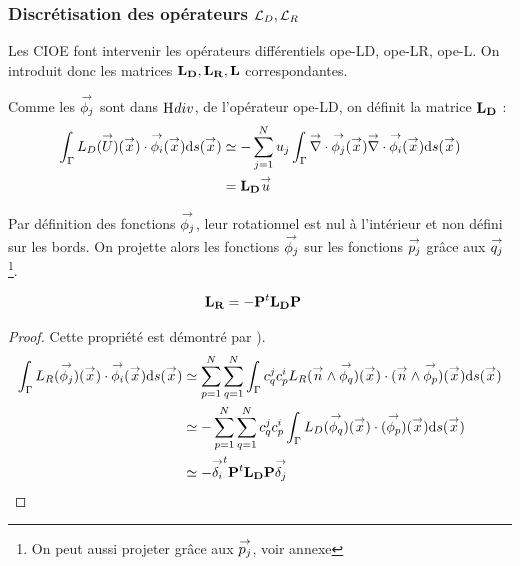     \subsubsection[Discrétisation des opérateurs LD, LR]{Discrétisation des opérateurs \(\LD,\LR\)}
      Les CIOE font intervenir les opérateurs différentiels \gls{ope-LD}, \gls{ope-LR}, \gls{ope-L}. On introduit donc les matrices \(\mLD,\mLR,\mL\) correspondantes.

      Comme les \(\phij\) sont dans \(\Hdiv\), de l'opérateur \gls{ope-LD}, on définit la matrice \(\mLD\) :
      \begin{align}
        \int_\Gamma L_D(\vect{U})(\vx) \cdot \phii(\vx) \dd{s}(\vx)
          & \simeq - \sum_{j=1}^N u_j \int_\Gamma \vdiv \phij(\vx) \vdiv \phii(\vx) \dd{s}(\vx) \\
          & = \mLD \vu
      \end{align}

      Par définition des fonctions \(\phij\), leur rotationnel est nul à l'intérieur et non défini sur les bords. On projette alors les fonctions \(\phij\) sur les fonctions \(\pj\) grâce aux \(\qj\) \footnote{On peut aussi projeter grâce aux \(\pj\), voir annexe}.

      \begin{prop}
        \begin{align}
          \mLR & = -\mPP^t\mLD\mPP
        \end{align}
      \end{prop}
      \begin{proof}
        Cette propriété est démontré par \cite[eq.~(13)]{stupfel_implementation_2015}).
        \begin{equation}
          \begin{aligned}
            \int_\Gamma L_R (\phij) (\vx) \cdot \phii(\vx) \dd{s}(\vx) & \simeq \sum_{p=1}^{N} \sum_{q=1}^{N} \int_\Gamma c_q^j c_p^i L_R (\vn \pvect \phiq) (\vx) \cdot (\vn \pvect \phip)(\vx) \dd{s}(\vx)
            \\
            & \simeq -\sum_{p=1}^{N} \sum_{q=1}^{N} c_q^j c_p^i \int_\Gamma L_D (\phiq) (\vx) \cdot (\phip)(\vx) \dd{s}(\vx)
            \\
            & \simeq -\vect{\delta_i}^t \mPP^t \mLD \mPP \vect{\delta_j}
          \end{aligned}
        \end{equation}
      \end{proof}

